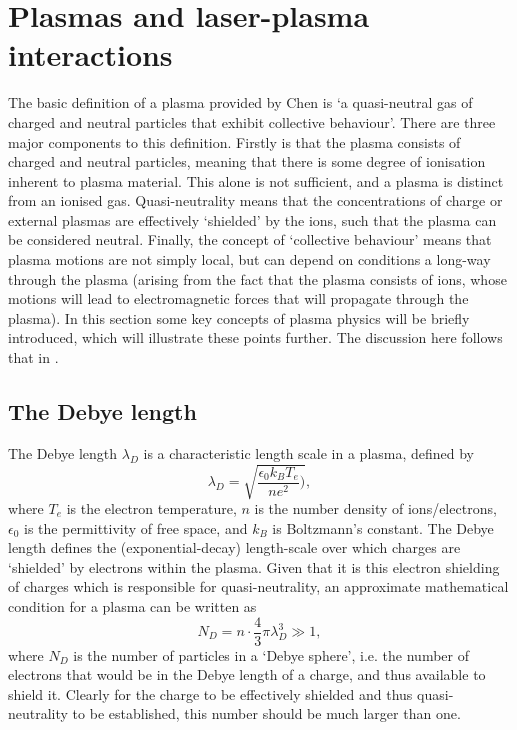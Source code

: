 \section{Plasmas and laser-plasma interactions}
The basic definition of a plasma provided by Chen \cite{Chen2016} is `a quasi-neutral gas of charged and neutral particles that exhibit collective behaviour'. There are three major components to this definition. Firstly is that the plasma consists of charged and neutral particles, meaning that there is some degree of ionisation inherent to plasma material. This alone is not sufficient, and a plasma is distinct from an ionised gas. Quasi-neutrality means that the concentrations of charge or external plasmas are effectively `shielded' by the ions, such that the plasma can be considered neutral. Finally, the concept of `collective behaviour' means that plasma motions are not simply local, but can depend on conditions a long-way through the plasma (arising from the fact that the plasma consists of ions, whose motions will lead to electromagnetic forces that will propagate through the plasma). In this section some key concepts of plasma physics will be briefly introduced, which will illustrate these points further. The discussion here follows that in \cite{Chen2016}.

\subsection{The Debye length}
The Debye length $\lambda_D$ is a characteristic length scale in a plasma, defined by
\begin{equation} \lambda_D = \sqrt{ \frac{\epsilon_0 k_B T_e}{n e^2})}, \end{equation}
where $T_e$ is the electron temperature, $n$ is the number density of ions/electrons, $\epsilon_0$ is the permittivity of free space, and $k_B$ is Boltzmann's constant. The Debye length defines the (exponential-decay) length-scale over which charges are `shielded' by electrons within the plasma. Given that it is this electron shielding of charges which is responsible for quasi-neutrality, an approximate mathematical condition for a plasma can be written as 
\begin{equation} N_D = n \cdot \frac{4}{3} \pi \lambda_D^3 \gg 1, \end{equation}
where $N_D$ is the number of particles in a `Debye sphere', i.e. the number of electrons that would be in the Debye length of a charge, and thus available to shield it. Clearly for the charge to be effectively shielded and thus quasi-neutrality to be established, this number should be much larger than one.

